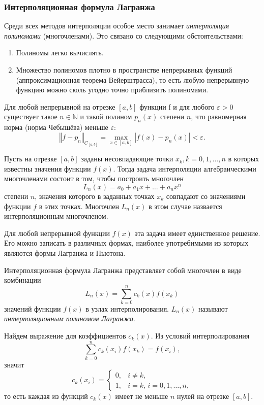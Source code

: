 \subsubsection{Интерполяционная формула Лагранжа}

Среди всех методов интерполяции особое место занимает \emph{интерполяция
полиномами} (многочленами). Это связано со следующими обстоятельствами:
\begin{enumerate}
\item Полиномы легко вычислять.
\item Множество полиномов плотно в пространстве непрерывных функций (аппроксимационная
теорема Вейерштрасса), то есть любую непрерывную функцию можно сколь
угодно точно приблизить полиномами.\end{enumerate}
\begin{thm}
\emph{} Для любой непрерывной на отрезке $[a,b]$ функции f и для
любого $\varepsilon>0$ существует такое $n\in\mathbb{N}$ и такой
полином $p_{n}(x)$ степени $n$, что равномерная норма (норма Чебышёва)
меньше $\varepsilon$:
\[
\left\Vert f-p_{n}\right\Vert _{C_{[a,b]}}=\max_{x\in[a,b]}|f(x)-p_{n}(x)|<\varepsilon.
\]

\end{thm}
Пусть на отрезке $[a,b]$ заданы несовпадающие точки $x_{k},k=0,1,\dots,n$
в которых известны значения функции $f(x)$. Тогда задача интерполяции
алгебраическими многочленами состоит в том, чтобы построить многочлен
\[
L_{n}(x)=a_{0}+a_{1}x+\dots+a_{n}x^{n}
\]
степени $n$, значения которого в заданных точках $x_{k}$ совпадают
со значениями функции $f$ в этих точках. Многочлен $L_{n}(x)$ в
этом случае назвается интерполяционным многочленом.

Для любой непрерывной функции $f(x)$ эта задача имеет единственное
решение. Его можно записать в различных формах, наиболее употребимыми
из которых являются формы Лагранжа и Ньютона.

Интерполяционная формула Лагранжа представляет собой многочлен в виде
комбинации
\[
L_{n}(x)=\sum_{k=0}^{n}c_{k}(x)f(x_{k})
\]
значений функции $f(x)$ в узлах интерполирования. $L_{n}(x)$ называют
\emph{интерполяционным полиномом Лагранжа}.

Найдем выражение для коэффициентов $c_{k}(x)$. Из условий интерполирования
\[
\sum_{k=0}^{n}c_{k}(x_{i})f(x_{k})=f(x_{i}),
\]
значит
\[
c_{k}(x_{i})=\begin{cases}
0, & i\neq k,\\
1, & i=k,\, i=0,1,\dots,n,
\end{cases}
\]
то есть каждая из функций $c_{k}(x)$ имеет не меньше $n$ нулей на
отрезке $[a,b]$.

